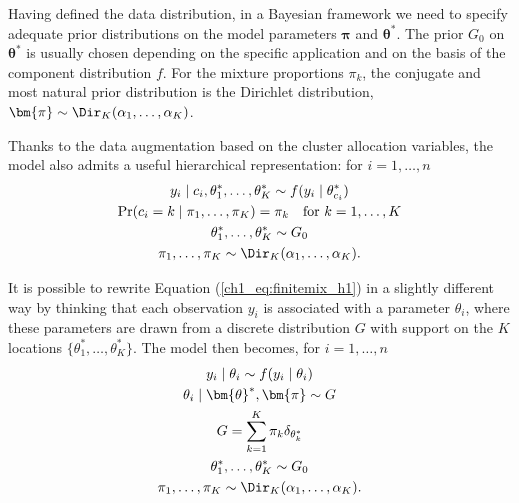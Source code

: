 Having defined the data distribution, in a Bayesian framework we need to specify adequate prior distributions on the model parameters $\bm{\pi}$ and $\bm{\theta}^*$. The prior $G_0$ on $\bm{\theta}^*$ is usually chosen depending on the specific application and on the basis of the component distribution $f$. For the mixture proportions $\pi_k$, the conjugate and most natural prior distribution is the Dirichlet distribution, $\bm{\pi}\sim \Dir_K(\alpha_1,\dots,\alpha_K)$.

Thanks to the data augmentation based on the cluster allocation variables, the model also admits a useful hierarchical representation: for $i = 1,\dots,n$ 
\begin{equation}
\begin{gathered}
y_i \mid c_i, \theta^*_1,\dots, \theta^*_K \sim f(y_i\mid\theta^*_{c_i})\\
\Pr(c_i = k \mid \pi_1,\dots,\pi_K) = \pi_k \quad \text{for } k = 1,\dots,K\\ 
\theta^*_1,\dots,\theta^*_K \sim G_0\\
\pi_1,\dots,\pi_K  \sim \Dir_K(\alpha_1,\dots,\alpha_K).
\end{gathered}
\label{ch1_eq:finitemix_h1}
\end{equation}

It is possible to rewrite Equation (\ref{ch1_eq:finitemix_h1}) in a slightly different way by thinking that each observation $y_i$ is associated with a parameter $\theta_i$, where these parameters are drawn from a discrete distribution $G$ with support on the $K$ locations $\{\theta^*_1,\dots,\theta^*_K\}$. The model then becomes, for $i=1,\dots,n$
\begin{equation}
\begin{gathered}
y_i \mid \theta_i \sim f(y_i\mid\theta_i)\\
\theta_i \mid \bm{\theta}^*,\bm{\pi} \sim G \\
G= \sum_{k=1}^K \pi_k \delta_{\theta^*_k}\\
\theta^*_1,\dots,\theta^*_K \sim G_0\\
\pi_1,\dots,\pi_K \sim \Dir_K(\alpha_1,\dots,\alpha_K).
\end{gathered}
\label{ch1_eq:finitemix_h2}
\end{equation}

